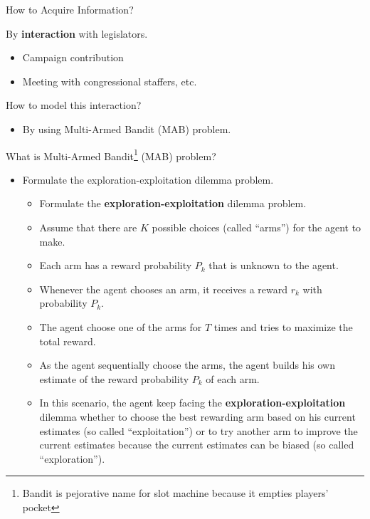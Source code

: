 \documentclass{beamer}
\begin{document}
	\begin{frame}{How to Acquire Information?}
		\begin{itemize}{
			\item By \textbf{interaction} with legislators.
				\begin{itemize}
					\item Campaign contribution
					\item Meeting with congressional staffers, etc.
				\end{itemize}
			\item How to model this interaction?
				 \begin{itemize}
					\item By using Multi-Armed Bandit (MAB) problem.
				\end{itemize}}
		\end{itemize}
	\end{frame}

	\begin{frame}{What is Multi-Armed Bandit\footnote{Bandit is pejorative name for slot machine because it empties players' pocket} (MAB) problem?}
		\begin{itemize}
			\item Formulate the exploration-exploitation dilemma problem.
			\begin{itemize}
				\item Formulate the \textbf{exploration-exploitation} dilemma problem.
				\item Assume that there are $K$ possible choices (called ``arms'') for the agent to make. 
				\item Each arm has a reward probability $P_k$ that is unknown to the agent.
				\item Whenever the agent chooses an arm, it receives a reward $r_k$ with probability $P_k$.
				\item The agent choose one of the arms for $T$ times and tries to maximize the total reward.
				\item As the agent sequentially choose the arms, the agent builds his own estimate of the reward probability $P_k$ of each arm.
				\item In this scenario, the agent keep facing the \textbf{exploration-exploitation} dilemma whether to choose the best rewarding arm based on his current estimates (so called ``exploitation'') or to try another arm to improve the current estimates because the current estimates can be biased (so called ``exploration'').
			\end{itemize}
		\end{itemize}
	\end{frame}
\end{document}
